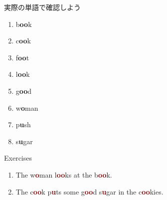 \documentclass[aspectratio=169,xcolor={dvipsnames,table}]{beamer}
\begin{document}
\begin{frame}[plain]{実際の単語で確認しよう}
\LARGE
\hfill{\scriptsize {}}

\begin{enumerate}
 \item b\textcolor{NavyBlue}{\bfseries oo}k%
\hfill{}\hspace{150pt}\mbox{}
 \item c\textcolor{NavyBlue}{\bfseries oo}k%
\hfill{}\hspace{150pt}\mbox{}
\item f\textcolor{NavyBlue}{\bfseries oo}t%
\hfill{}\hspace{150pt}\mbox{}
 \item l\textcolor{NavyBlue}{\bfseries oo}k%
\hfill{}\hspace{150pt}\mbox{}
 \item g\textcolor{NavyBlue}{\bfseries oo}d%
\hfill{}\hspace{150pt}\mbox{}
 \item w\textcolor{NavyBlue}{\bfseries o}man%
\hfill{}\hspace{150pt}\mbox{} 
 \item p\textcolor{NavyBlue}{\bfseries u}sh%
\hfill{}\hspace{150pt}\mbox{}
 \item s\textcolor{NavyBlue}{\bfseries u}gar%
\hfill{}\hspace{150pt}\mbox{}
\end{enumerate}
\end{frame}
\begin{frame}[plain]{Exercises }
\LARGE
\begin{enumerate}
 \item The w\textcolor{Maroon}{\bfseries o}man l\textcolor{Maroon}{\bfseries oo}ks at the b\textcolor{Maroon}{\bfseries oo}k.
 \item The c\textcolor{Maroon}{\bfseries oo}k p\textcolor{Maroon}{\bfseries u}ts some g\textcolor{Maroon}{\bfseries oo}d s\textcolor{Maroon}{\bfseries u}gar in the c\textcolor{Maroon}{\bfseries oo}kies.
\end{enumerate}
\hfill{\scriptsize {}}

\end{frame}
\end{document}
